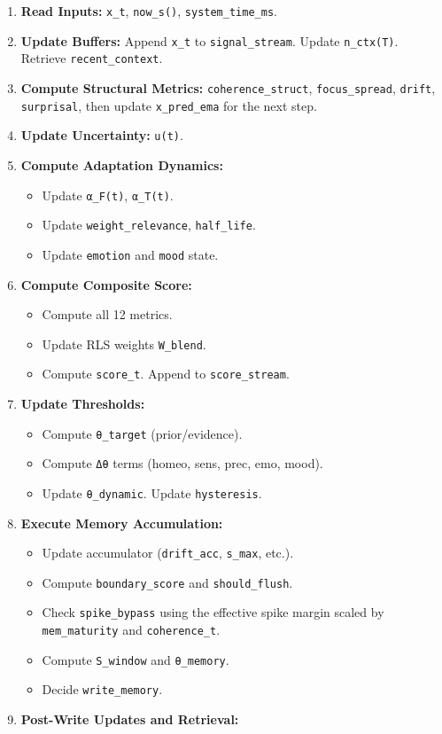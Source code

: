 \documentclass[
  letterpaper,
  DIV=11,
  numbers=noendperiod]{scrartcl}
\providecommand{\tightlist}{%
  \setlength{\itemsep}{0pt}\setlength{\parskip}{0pt}}
\begin{document}
\begin{enumerate}
\def\labelenumi{\arabic{enumi}.}
\tightlist
\item
  \textbf{Read Inputs:} \texttt{x\_t}, \texttt{now\_s()},
  \texttt{system\_time\_ms}.
\item
  \textbf{Update Buffers:} Append \texttt{x\_t} to
  \texttt{signal\_stream}. Update \texttt{n\_ctx(T)}. Retrieve
  \texttt{recent\_context}.
\item
  \textbf{Compute Structural Metrics:} \texttt{coherence\_struct},
  \texttt{focus\_spread}, \texttt{drift}, \texttt{surprisal}, then
  update \texttt{x\_pred\_ema} for the next step.
\item
  \textbf{Update Uncertainty:} \texttt{u(t)}.
\item
  \textbf{Compute Adaptation Dynamics:}

  \begin{itemize}
  \tightlist
  \item
    Update \texttt{α\_F(t)}, \texttt{α\_T(t)}.
  \item
    Update \texttt{weight\_relevance}, \texttt{half\_life}.
  \item
    Update \texttt{emotion} and \texttt{mood} state.
  \end{itemize}
\item
  \textbf{Compute Composite Score:}

  \begin{itemize}
  \tightlist
  \item
    Compute all 12 metrics.
  \item
    Update RLS weights \texttt{W\_blend}.
  \item
    Compute \texttt{score\_t}. Append to \texttt{score\_stream}.
  \end{itemize}
\item
  \textbf{Update Thresholds:}

  \begin{itemize}
  \tightlist
  \item
    Compute \texttt{θ\_target} (prior/evidence).
  \item
    Compute \texttt{Δθ} terms (homeo, sens, prec, emo, mood).
  \item
    Update \texttt{θ\_dynamic}. Update \texttt{hysteresis}.
  \end{itemize}
\item
  \textbf{Execute Memory Accumulation:}

  \begin{itemize}
  \tightlist
  \item
    Update accumulator (\texttt{drift\_acc}, \texttt{s\_max}, etc.).
  \item
    Compute \texttt{boundary\_score} and \texttt{should\_flush}.
  \item
    Check \texttt{spike\_bypass} using the effective spike margin scaled
    by \texttt{mem\_maturity} and \texttt{coherence\_t}.
  \item
    Compute \texttt{S\_window} and \texttt{θ\_memory}.
  \item
    Decide \texttt{write\_memory}.
  \end{itemize}
\item
  \textbf{Post-Write Updates and Retrieval:}


\end{enumerate}
\end{document}
